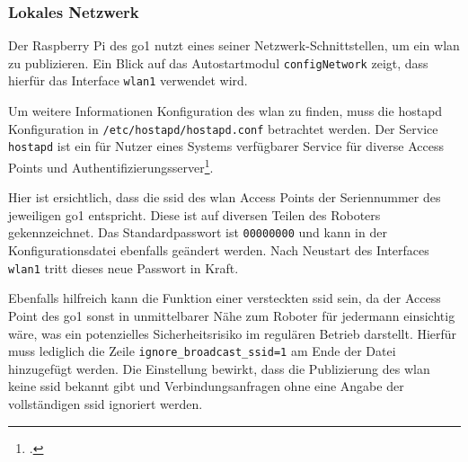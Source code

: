 \subsubsection{Lokales Netzwerk}
\label{subsubsec:lokales-netzwerk}

Der Raspberry Pi des \gls{go1} nutzt eines seiner Netzwerk-Schnittstellen, um ein \gls{wlan} zu publizieren.
Ein Blick auf das Autostartmodul \texttt{configNetwork} zeigt, dass hierfür das Interface \texttt{wlan1} verwendet wird.



\noindent Um weitere Informationen Konfiguration des \gls{wlan} zu finden, muss die \gls{hostapd} Konfiguration in
\texttt{/etc/\allowbreak hostapd/\allowbreak hostapd\allowbreak .conf} betrachtet werden.
Der Service \texttt{\gls{hostapd}} ist ein für Nutzer eines Systems verfügbarer Service für diverse Access Points und
Authentifizierungsserver\footcite{hostapd-doc}.



\noindent Hier ist ersichtlich, dass die \gls{ssid} des \gls{wlan} Access Points der Seriennummer des jeweiligen \gls{go1} entspricht.
Diese ist auf diversen Teilen des Roboters gekennzeichnet.
Das Standardpasswort ist \texttt{00000000} und kann in der Konfigurationsdatei ebenfalls geändert werden.
Nach Neustart des Interfaces \texttt{wlan1} tritt dieses neue Passwort in Kraft.

Ebenfalls hilfreich kann die Funktion einer versteckten \gls{ssid} sein, da der Access Point des \gls{go1} sonst in unmittelbarer
Nähe zum Roboter für jedermann einsichtig wäre, was ein potenzielles Sicherheitsrisiko im regulären Betrieb darstellt.
Hierfür muss lediglich die Zeile \texttt{ignore\_\allowbreak broadcast\_\allowbreak ssid=1} am Ende der Datei hinzugefügt werden.
Die Einstellung bewirkt, dass die Publizierung des \gls{wlan} keine \gls{ssid} bekannt gibt und Verbindungsanfragen ohne eine Angabe der
vollständigen \gls{ssid} ignoriert werden.

